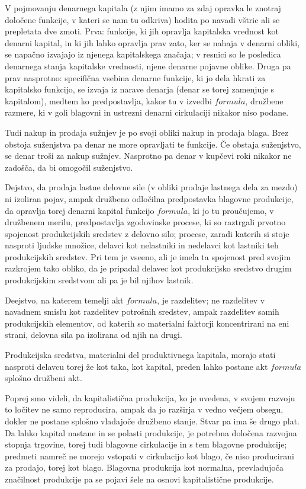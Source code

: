 \documentclass[kapital_02.tex]{subfiles}
\begin{document}
V pojmovanju denarnega kapitala (z njim imamo za zdaj opravka le znotraj določene funkcije, v kateri se nam tu odkriva) hodita po navadi vštric ali se prepletata dve zmoti. Prva: funkcije, ki jih opravlja kapitalska vrednost kot denarni kapital, in ki jih lahko opravlja prav zato, ker se nahaja v denarni obliki, se napačno izvajajo iz njenega kapitalskega značaja; v resnici so le posledica denarnega stanja kapitalske vrednosti, njene denarne pojavne oblike. Druga pa prav nasprotno: specifična vsebina denarne funkcije, ki jo dela hkrati za kapitalsko funkcijo, se izvaja iz narave denarja (denar se torej zamenjuje s kapitalom), medtem ko predpostavlja, kakor tu v izvedbi \( formula \), družbene razmere, ki v goli blagovni in ustrezni denarni cirkulaciji nikakor niso podane.

Tudi nakup in prodaja sužnjev je po svoji obliki nakup in prodaja blaga. Brez obstoja suženjstva pa denar ne more opravljati te funkcije. Če obstaja suženjstvo, se denar troši za nakup sužnjev. Nasprotno pa denar v kupčevi roki nikakor ne zadošča, da bi omogočil suženjstvo.

Dejstvo, da prodaja lastne delovne sile (v obliki prodaje lastnega dela za mezdo) ni izoliran pojav, ampak družbeno odločilna predpostavka blagovne produkcije, da opravlja torej denarni kapital funkcijo \( formula \), ki jo tu proučujemo, v družbenem merilu, predpostavlja zgodovinske procese, ki so raztrgali prvotno spojenost produkcijskih sredstev z delovno silo; procese, zaradi katerih si stoje nasproti ljudske množice, delavci kot nelastniki in nedelavci kot lastniki teh produkcijskih sredstev. Pri tem je vseeno, ali je imela ta spojenost pred svojim razkrojem tako obliko, da je pripadal delavec kot produkcijsko sredstvo drugim produkcijskim sredstvom ali pa je bil njihov lastnik.

Deejstvo, na katerem temelji akt \( formula \), je razdelitev; ne razdelitev v navadnem smislu kot razdelitev potrošnih sredstev, ampak razdelitev samih produkcijskih elementov, od katerih so materialni faktorji koncentrirani na eni strani, delovna sila pa izolirana od njih na drugi.

Produkcijska sredstva, materialni del produktivnega kapitala, morajo stati nasproti delavcu torej že kot taka, kot kapital, preden lahko postane akt \( formula \) splošno družbeni akt.

Poprej smo videli, da kapitalistična produkcija, ko je uvedena, v svojem razvoju to ločitev ne samo reproducira, ampak da jo razširja v vedno večjem obsegu, dokler ne postane splošno vladajoče družbeno stanje. Stvar pa ima še drugo plat. Da lahko kapital nastane in se polasti produkcije, je potrebna določena razvojna stopnja trgovine, torej tudi blagovne cirkulacije in s tem blagovne produkcije; predmeti namreč ne morejo vstopati v cirkulacijo kot blago, če niso producirani za prodajo, torej kot blago. Blagovna produkcija kot normalna, prevladujoča značilnost produkcije pa se pojavi šele na osnovi kapitalistične produkcije.
\end{document}

